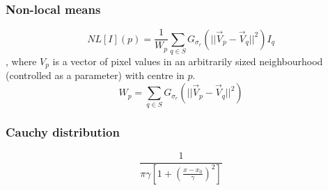 \subsubsection{Non-local means}
\begin{equation*}
    NL[I](p) = \frac{1}{W_p} \sum_{q\in S} G_{\sigma_r}(||\vec{V}_p-\vec{V}_q||^2)I_q
\end{equation*},
where $V_p$ is a vector of pixel values in an arbitrarily sized neighbourhood (controlled as a parameter) with centre in $p$.
\begin{equation*}
    W_p = \sum_{q\in S} G_{\sigma_r}(||\vec{V}_p-\vec{V}_q||^2)
\end{equation*}

\subsubsection{Cauchy distribution}
\begin{equation*}
    \frac{1}{\pi \gamma \left[1+\left(\frac{x-x_0}{\gamma}\right)^2\right]}
\end{equation*}